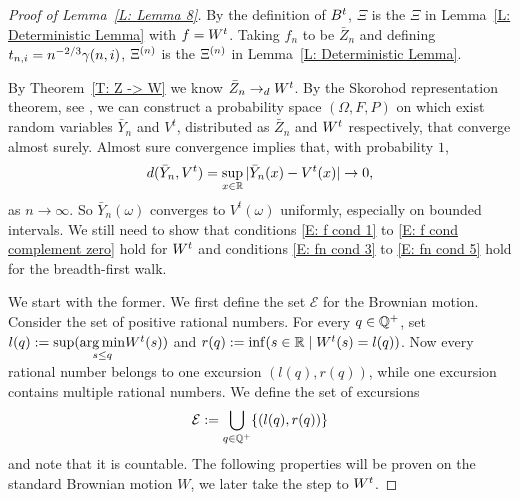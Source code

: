 \begin{proof}[Proof of Lemma~\ref{L: Lemma 8}]
	By the definition of $B^t$, 
	$\Xi$ is the $\Xi$ in Lemma~\ref{L: Deterministic Lemma} with $f = W^t$.
	Taking $f_n$ to be $\bar{Z}_n$ and defining $t_{n, i} = n^{-2 / 3} \gamma(n,i)$,
	$\Xi^{(n)}$ is the $\Xi^{(n)}$ in Lemma~\ref{L: Deterministic Lemma}.
	
	By Theorem~\ref{T: Z -> W} we know $\bar{Z}_n \rightarrow_d W^t$.
	By the Skorohod representation theorem,
	see \cite{Billingsley2009}, 
	we can construct a probability space 
	$(\Omega, F, P)$ 
	on which exist random variables
	$\bar{Y}_n$ and $V^t$,
	distributed as 
	$\bar{Z}_n$ and $W^t$ respectively,
	that converge almost surely.
	Almost sure convergence implies that,
	with probability $1$,
	\begin{equation}
	d(\bar{Y}_n, V^t) = \sup_{x \in \mathbb{R}}|\bar{Y}_n(x) - V^t(x)| \rightarrow 0,
	\end{equation}
	as $n \rightarrow \infty$.
	So $\bar{Y}_n(\omega)$ converges to $V^t(\omega)$ uniformly,
	especially on bounded intervals.
	We still need to show that conditions \eqref{E: f cond 1} to \eqref{E: f cond complement zero} hold for $W^t$
	and conditions \eqref{E: fn cond 3} to \eqref{E: fn cond 5} hold for the breadth-first walk.
	
	
	We start with the former. 
	We first define the set $\mathcal{E}$ for the Brownian motion.
	Consider the set of positive rational numbers.
	For every $q \in \mathbb{Q}^+$, 
	set $l(q) := \sup( \underset{s \leq q}{\operatorname*{arg\,min}} W^t(s) ) $ 
	and $r(q) := \inf( {s \in \mathbb{R} \; | \; W^t(s) = l(q)} ) $.
	Now every rational number belongs to one excursion $(l(q), r(q))$,
	while one excursion contains multiple rational numbers.
	We define the set of excursions
	\begin{equation}
	\mathcal{E} := \bigcup_{q \in \mathbb{Q}^+} \{ (l(q), r(q)) \}
	\end{equation}
	and note that it is countable.
	The following properties will be proven on the standard Brownian motion $W$,
	we later take the step to $W^t$.
	

\end{proof}
